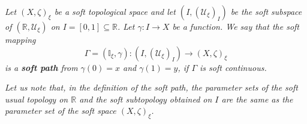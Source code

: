 \documentclass[preprint,12pt]{elsarticle}
\begin{document}
\begin{defn}\em{
Let $(X, \zeta)_ \xi$ be a soft topological space and let $(I,(\mathscr{U}_{\xi})_{I})$ be the soft subspace of  $(\mathbb{R},\mathscr{U}_\xi)$ on $I = [0,1] \subseteq \mathbb{R}$. Let
$\gamma \colon I \to X$
be a function. We say that the soft mapping $$\Gamma=(\mathbb{I}_\xi,\gamma) :(I,(\mathscr{U}_{\xi})_{I})\to (X, \zeta)_ \xi$$  is a \textbf{soft path} from $\gamma(0)=x$ and $\gamma(1)=y$, if $\Gamma$ is soft continuous.}
\end{defn}
\begin{rem}\em{
Let us note that, in the definition of the soft path, the parameter sets of  the soft usual topology on $\mathbb{R}$ and the soft subtopology obtained on $I$ are the same as the parameter set of the soft space $(X, \zeta)_\xi$.}
\end{rem}
\end{document}
